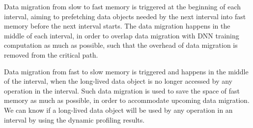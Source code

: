 Data migration from slow to fast memory is triggered at the beginning of each interval, aiming to prefetching data objects needed by the next interval into fast memory before the next interval starts. The data migration happens in the middle of each interval, in order to overlap data migration with DNN training computation as much as possible, such that the overhead of data migration is removed from the critical path. 

Data migration from fast to slow memory is triggered and happens in the middle of the interval, when the long-lived data object is \textcolor{check}{no longer accessed by any operation in the interval}. Such data migration is used to save the space of fast memory as much as possible, in order to accommodate upcoming data migration. \textcolor{check}{We can know if a long-lived data object will be used by any operation in an interval by using the dynamic profiling results.}

